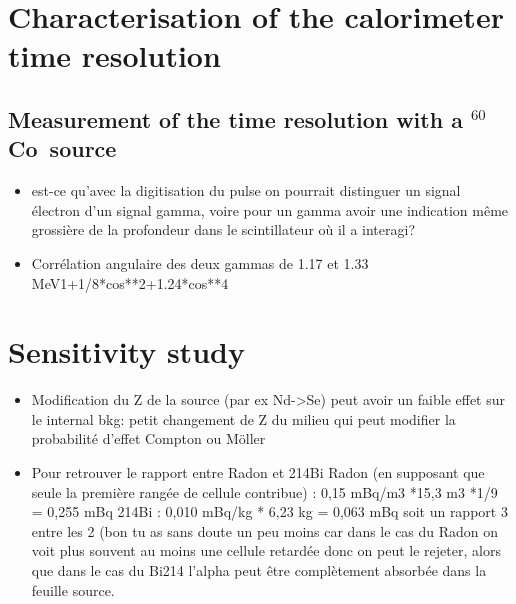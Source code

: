 \documentclass[a4paper,12pt, twoside]{memoir}   	%
\newcommand{\Co}{$^{60}$Co}
\begin{document}
\chapter{Characterisation of the calorimeter time resolution}
\section{Measurement of the time resolution with a \Co\ source}
\begin{itemize}
\item est-ce qu'avec la digitisation du pulse on pourrait distinguer un signal électron d'un signal gamma, voire pour un gamma avoir une indication même grossière de la profondeur dans le scintillateur où il a interagi?
\item Corrélation angulaire des deux gammas de 1.17 et 1.33 MeV1+1/8*cos**2+1.24*cos**4
\end{itemize}


\chapter{Sensitivity study}
\begin{itemize}
\item Modification du Z de la source (par ex Nd->Se) peut avoir un faible effet sur le internal bkg: petit changement de Z du milieu qui peut modifier la probabilité d'effet Compton ou Möller
\item Pour retrouver le rapport entre Radon et 214Bi
Radon (en supposant que seule la première rangée de cellule contribue) : 0,15 mBq/m3 *15,3 m3 *1/9 = 0,255 mBq
214Bi : 0,010 mBq/kg * 6,23  kg = 0,063 mBq
soit un rapport 3 entre les 2 (bon tu as sans doute un peu moins car dans le cas du Radon on voit plus souvent au moins une cellule retardée donc on peut le rejeter, alors que dans le cas du Bi214 l'alpha peut être complètement absorbée dans la feuille source.
\end{itemize}
\end{document}
